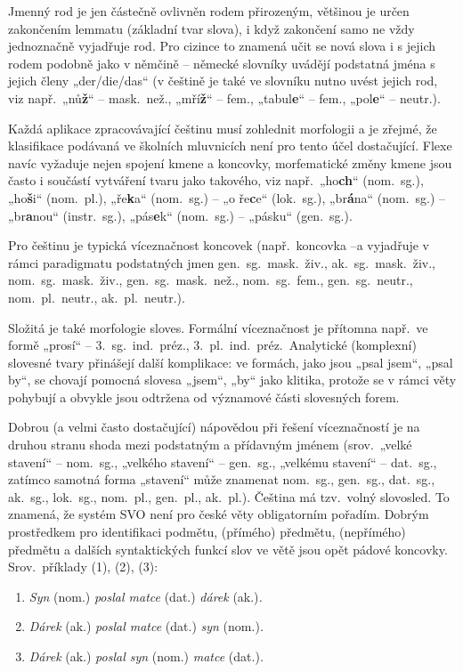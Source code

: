 \begin{multicols}{2}
Jmenný rod je jen částečně ovlivněn rodem přirozeným, většinou je určen zakončením lemmatu (základní tvar slova), i když zakončení samo ne vždy jednoznačně vyjadřuje rod. Pro cizince to znamená učit se nová slova i s jejich rodem podobně jako v němčině – německé slovníky uvádějí podstatná jména s jejich členy „der/die/das“ (v češtině je také ve slovníku nutno uvést jejich rod, viz např.~„nů\textbf{ž}“ – mask.~než., „mří\textbf{ž}“ – fem., „tabul\textbf{e}“ – fem., „pol\textbf{e}“ – neutr.).

Každá aplikace zpracovávající češtinu musí zohlednit morfologii a je zřejmé, že klasifikace podávaná ve školních mluvnicích není pro tento účel dostačující. Flexe navíc vyžaduje nejen spojení kmene a koncovky, morfematické změny kmene jsou často i součástí vytváření tvaru jako takového, viz např.~„ho\textbf{ch}“ (nom.~sg.), „ho\textbf{š}i“ (nom.~pl.), „ře\textbf{k}a“ (nom.~sg.) – „o ře\textbf{c}e“ (lok.~sg.), „br\textbf{á}na“ (nom.~sg.) – „br\textbf{a}nou“ (instr.~sg.), „pás\textbf{e}k“ (nom.~sg.) – „pásku“ (gen.~sg.).

Pro češtinu je typická víceznačnost koncovek (např.~koncovka –a vyjadřuje v rámci paradigmatu podstatných jmen gen.~sg.~mask.~živ., ak.~sg.~mask.~živ., nom.~sg.~mask.~živ., gen.~sg.~mask.~než., nom.~sg.~fem., gen.~sg.~neutr., nom.~pl.~neutr., ak.~pl.~neutr.).

Složitá je také morfologie sloves. Formální víceznačnost je přítomna např.~ve formě „prosí“ – 3.~sg.~ind.~préz., 3.~pl.~ind.~préz.~Analytické (komplexní) slovesné tvary přinášejí další komplikace: ve formách, jako jsou „psal jsem“, „psal by“, se chovají pomocná slovesa „jsem“, „by“ jako klitika, protože se  v rámci věty pohybují a obvykle jsou odtržena od významové části slovesných forem.

Dobrou (a velmi často dostačující) nápovědou při řešení víceznačností je na druhou stranu shoda mezi podstatným a přídavným jménem (srov.~„velké stavení“ – nom.~sg., „velkého stavení“ – gen.~sg., „velkému stavení“ – dat.~sg., zatímco samotná forma „stavení“ může znamenat nom.~sg., gen.~sg., dat.~sg., ak.~sg., lok.~sg., nom.~pl., gen.~pl., ak.~pl.).
Čeština má tzv.~volný slovosled. To znamená, že systém SVO není pro české věty obligatorním pořadím. Dobrým prostředkem pro identifikaci podmětu, (přímého) předmětu, (nepřímého) předmětu a dalších syntaktických funkcí slov ve větě jsou opět pádové koncovky. Srov.~příklady (1), (2), (3):

\begin{enumerate}
\item	\textit{Syn} (nom.) \textit{poslal matce} (dat.) \textit{dárek} (ak.)\textit{.}
\item	\textit{Dárek} (ak.) \textit{poslal matce} (dat.) \textit{syn} (nom.)\textit{.}
\item	\textit{Dárek} (ak.) \textit{poslal syn} (nom.) \textit{matce} (dat.)\textit{.}
\end{enumerate}


\end{multicols}
